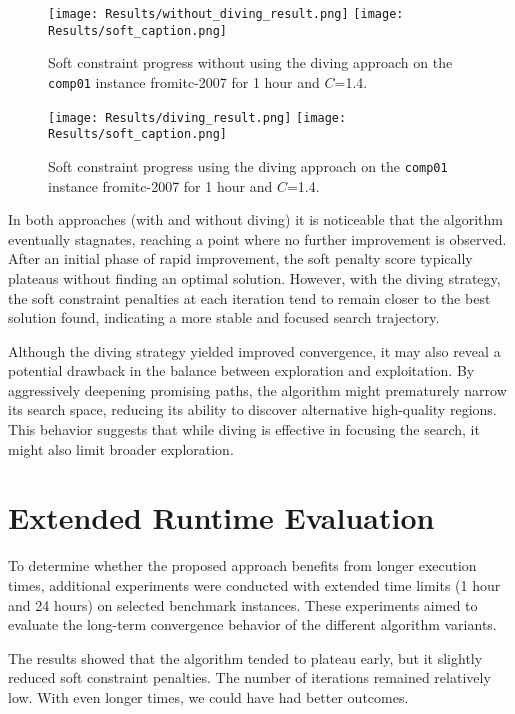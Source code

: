 \begin{figure}
 \centering
    \texttt{[image: Results/without\_diving\_result.png]}
    \texttt{[image: Results/soft\_caption.png]}
    \caption{Soft constraint progress without using the diving approach on the \texttt{comp01} instance from\ac{itc-2007} for 1 hour and \(C\)=1.4.}
    \label{fig:without_diving_result}
\end{figure}

\begin{figure}
 \centering
    \texttt{[image: Results/diving\_result.png]}
    \texttt{[image: Results/soft\_caption.png]}
    \caption{Soft constraint progress using the diving approach on the \texttt{comp01} instance from\ac{itc-2007} for 1 hour and \(C\)=1.4.}
    \label{fig:diving_result}
\end{figure}

In both approaches (with and without diving) it is noticeable that the algorithm eventually stagnates, reaching a point where no further improvement is observed. After an initial phase of rapid improvement, the soft penalty score typically plateaus without finding an optimal solution. However, with the diving strategy, the soft constraint penalties at each iteration tend to remain closer to the best solution found, indicating a more stable and focused search trajectory.

Although the diving strategy yielded improved convergence, it may also reveal a potential drawback in the balance between exploration and exploitation. By aggressively deepening promising paths, the algorithm might prematurely narrow its search space, reducing its ability to discover alternative high-quality regions. This behavior suggests that while diving is effective in focusing the search, it might also limit broader exploration.

\section{Extended Runtime Evaluation}

To determine whether the proposed approach benefits from longer execution times, additional experiments were conducted with extended time limits (1 hour and 24 hours) on selected benchmark instances. These experiments aimed to evaluate the long-term convergence behavior of the different algorithm variants.

The results showed that the algorithm tended to plateau early, but it slightly reduced soft constraint penalties. The number of iterations remained relatively low. With even longer times, we could have had better outcomes.

